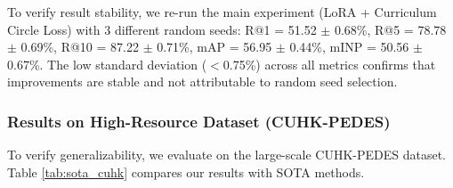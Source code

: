 \documentclass{article}
\begin{document}
\begin{table}[H]
    \centering
    \vspace{-0.5em} 
    \caption{Comparison with SOTA methods on 3000VnPersonSearch. Best results are in bold.}
    \label{tab:sota_vn}
\end{table}

To verify result stability, we re-run the main experiment (LoRA + Curriculum Circle Loss) with 3 different random seeds: R@1 = 51.52 $\pm$ 0.68\%, R@5 = 78.78 $\pm$ 0.69\%, R@10 = 87.22 $\pm$ 0.71\%, mAP = 56.95 $\pm$ 0.44\%, mINP = 50.56 $\pm$ 0.67\%. The low standard deviation ($<$0.75\%) across all metrics confirms that improvements are stable and not attributable to random seed selection.

\subsubsection{Results on High-Resource Dataset (CUHK-PEDES)}
To verify generalizability, we evaluate on the large-scale CUHK-PEDES dataset. Table \ref{tab:sota_cuhk} compares our results with SOTA methods.
\end{document}
